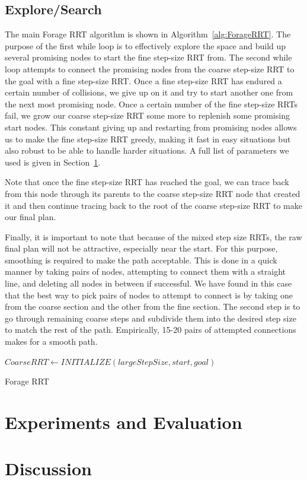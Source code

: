 \documentclass[conference]{IEEEtran}
\begin{document}
\subsection{Explore/Search}
The main Forage RRT algorithm is shown in Algorithm~\ref{alg:ForageRRT}. The purpose of the first while loop is to effectively explore the
space and build up several promising nodes to start the fine step-size RRT from. The second while loop attempts to connect the promising
nodes from the coarse step-size RRT to the goal with a fine step-size RRT. Once a fine step-size RRT has endured a certain number of
collisions, we give up on it and try to start another one from the next most promising node. Once a certain number of the fine step-size
RRTs fail, we grow our coarse step-size RRT some more to replenish some promising start nodes. This constant giving up and restarting from
promising nodes allows us to make the fine step-size RRT greedy, making it fast in easy situations but also robust to be able to handle
harder situations. A full list of parameters we used is given in Section~\ref{sec:evaluation}.

Note that once the fine step-size RRT has reached the goal, we can trace back from this node through its parents to the coarse step-size RRT
node that created it and then continue tracing back to the root of the coarse step-size RRT to make our final plan. 

Finally, it is important to note that because of the mixed step size RRTs, the raw final plan will not be attractive, especially near the
start. For this purpose, smoothing is required to make the path acceptable. This is done in a quick manner by taking pairs of nodes,
attempting to connect them with a straight line, and deleting all nodes in between if successful. We have found in this case that the
best way to pick pairs of nodes to attempt to connect is by taking one from the coarse section and the other from the fine section.  The
second step is to go through remaining coarse steps and subdivide them into the desired step size to match the rest of the path.
Empirically, 15-20 pairs of attempted connections makes for a smooth path. 

\begin{algorithm}
 \label{alg:ForageRRT}
 \SetAlgoLined
	$CoarseRRT \leftarrow INITIALIZE(largeStepSize, start, goal)$\;
\caption{Forage RRT}
\end{algorithm}



\section{Experiments and Evaluation}
\label{sec:evaluation}

\section{Discussion}



\end{document}
